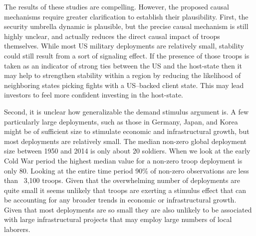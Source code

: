 \documentclass[12pt]{article}
\begin{document}
\begin{doublespace}

The results of these studies are compelling. However, the proposed causal mechanisms require greater clarification to establish their plausibility. First, the security umbrella dynamic is plausible, but the precise causal mechanism is still highly unclear, and actually reduces the direct causal impact of troops themselves. While most US military deployments are relatively small, stability could still result from a sort of signaling effect. If the presence of those troops is taken as an indicator of strong ties between the US and the host-state then it may help to strengthen stability within a region by reducing the likelihood of neighboring states picking fights with a US--backed client state. This may lead investors to feel more confident investing in the host-state. 

Second, it is unclear how generalizable the demand stimulus argument is. A few particularly large deployments, such as those in Germany, Japan, and Korea might be of sufficient size to stimulate economic and infrastructural growth, but most deployments are relatively small. The median non-zero global deployment size between 1950 and 2014 is only about 20 soldiers. When we look at the early Cold War period the highest median value for a non-zero troop deployment is only 80. Looking at the entire time period 90\% of non-zero observations are less than ~3,100 troops. Given that the overwhelming number of deployments are quite small it seems unlikely that troops are exerting a stimulus effect that can be accounting for any broader trends in economic or infrastructural growth. Given that most deployments are so small they are also unlikely to be associated with large infrastructural projects that may employ large numbers of local laborers. 


\end{doublespace}
\end{document}
